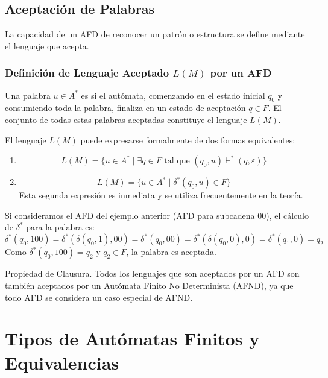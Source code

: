 \subsection{Aceptación de Palabras} %

La capacidad de un AFD de reconocer un patrón o estructura se define mediante el lenguaje que acepta.

\subsubsection{Definición de Lenguaje Aceptado $L(M)$ por un AFD}
Una palabra $u \in A^*$ es  si el autómata, comenzando en el estado inicial $q_0$ y consumiendo toda la palabra, finaliza en un estado de aceptación $q \in F$. El conjunto de todas estas palabras aceptadas constituye el lenguaje $L(M)$.

El lenguaje $L(M)$ puede expresarse formalmente de dos formas equivalentes:

\begin{enumerate}
    \item {}
    \[ L(M) = \{u \in A^* \mid \exists q \in F \text{ tal que } (q_0, u) \vdash^* (q, \varepsilon)\} \]
    \item {}
    \[ L(M) = \{u \in A^* \mid \delta^*(q_0, u) \in F\} \]
    Esta segunda expresión es inmediata y se utiliza frecuentemente en la teoría.
\end{enumerate}

\begin{ejemplo}
Si consideramos el AFD del ejemplo anterior (AFD para subcadena $00$), el cálculo de $\delta^*$ para la palabra  es:
\[ \delta^*(q_0, 100) = \delta^*(\delta(q_0, 1), 00) = \delta^*(q_0, 00) = \delta^*(\delta(q_0, 0), 0) = \delta^*(q_1, 0) = q_2 \]
Como $\delta^*(q_0, 100) = q_2$ y $q_2 \in F$, la palabra es aceptada.
\end{ejemplo}

\begin{anotacion}{Propiedad de Clausura.}
Todos los lenguajes que son aceptados por un AFD son también aceptados por un Autómata Finito No Determinista (AFND), ya que todo AFD se considera un caso especial de AFND.
\end{anotacion}



\section{Tipos de Autómatas Finitos y Equivalencias} %

